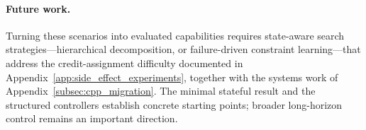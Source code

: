 \paragraph{Future work.}
Turning these scenarios into evaluated capabilities requires state-aware search strategies---hierarchical decomposition, or failure-driven constraint learning---that address the credit-assignment difficulty documented in Appendix~\ref{app:side_effect_experiments}, together with the systems work of Appendix~\ref{subsec:cpp_migration}. The minimal stateful result and the structured controllers establish concrete starting points; broader long-horizon control remains an important direction.

\newpage

